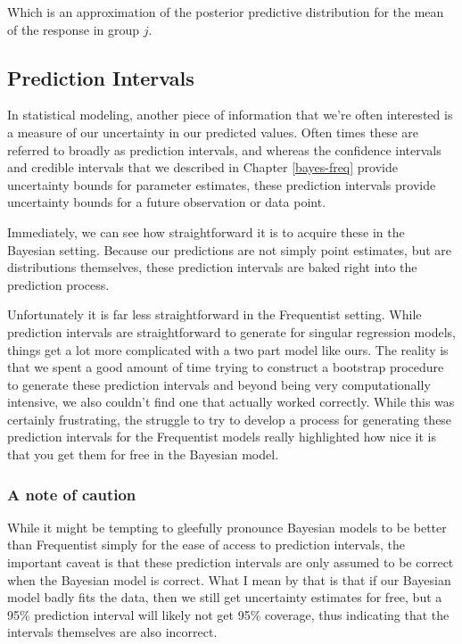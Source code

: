 \documentclass[12pt,twoside]{reedthesis}
\begin{document}
Which is an approximation of the posterior predictive distribution for the mean of the response in group \(j\).

\hypertarget{wraptwo}{%
\subsection{Prediction Intervals}\label{wraptwo}}

In statistical modeling, another piece of information that we're often interested is a measure of our uncertainty in our predicted values. Often times these are referred to broadly as prediction intervals, and whereas the confidence intervals and credible intervals that we described in Chapter \ref{bayes-freq} provide uncertainty bounds for parameter estimates, these prediction intervals provide uncertainty bounds for a future observation or data point.

Immediately, we can see how straightforward it is to acquire these in the Bayesian setting. Because our predictions are not simply point estimates, but are distributions themselves, these prediction intervals are baked right into the prediction process.

Unfortunately it is far less straightforward in the Frequentist setting. While prediction intervals are straightforward to generate for singular regression models, things get a lot more complicated with a two part model like ours. The reality is that we spent a good amount of time trying to construct a bootstrap procedure to generate these prediction intervals and beyond being very computationally intensive, we also couldn't find one that actually worked correctly. While this was certainly frustrating, the struggle to try to develop a process for generating these prediction intervals for the Frequentist models really highlighted how nice it is that you get them for free in the Bayesian model.

\hypertarget{a-note-of-caution}{%
\subsubsection{A note of caution}\label{a-note-of-caution}}

While it might be tempting to gleefully pronounce Bayesian models to be better than Frequentist simply for the ease of access to prediction intervals, the important caveat is that these prediction intervals are only assumed to be correct when the Bayesian model is correct. What I mean by that is that if our Bayesian model badly fits the data, then we still get uncertainty estimates for free, but a 95\% prediction interval will likely not get 95\% coverage, thus indicating that the intervals themselves are also incorrect.
\end{document}
